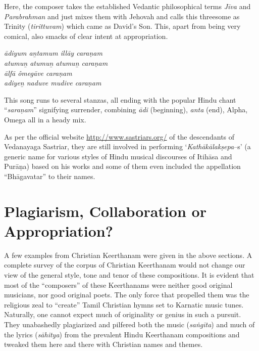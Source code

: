 \begin{myquote}
\end{myquote}

\begin{myquote}
\end{myquote}

Here, the composer takes the established Vedantic philosophical terms \textit{Jīva} and \textit{Parabrahman} and just mixes them with Jehovah and calls this threesome as Trinity (\textit{tirittuvam}) which came as David’s Son. This, apart from being very comical, also smacks of clear intent at appropriation.

\begin{myquote}
\textit{ādiyum aṉtamum illāy caraṇam\\ atumuṉ atumuṉ atumuṉ caraṇam\\ ālfā ômegāve caraṇam\\ adiyeṉ naduve mudive caraṇam}
\end{myquote}

\begin{myquote}
\end{myquote}

This song runs to several stanzas, all ending with the popular Hindu chant “\textit{saraṇam}” signifying surrender, combining \textit{ādi} (beginning), \textit{anta} (end), Alpha, Omega all in a heady mix.

As per the official website \url{http://www.sastriars.org/} of the descendants of Vedanayaga Sastriar, they are still involved in performing ‘\textit{Kathākālakṣepa}–s’ (a generic name for various styles of Hindu musical discourses of Itihāsa and Purāṇa) based on his works and some of them even included the appellation “Bhāgavatar” to their names.


\section*{Plagiarism, Collaboration or Appropriation?}

A few examples from Christian Keerthanam were given in the above sections. A complete survey of the corpus of Christian Keerthanam would not change our view of the general style, tone and tenor of these compositions. It is evident that most of the “composers” of these Keerthanams were neither good original musicians, nor good original poets. The only force that propelled them was the religious zeal to “create” Tamil Christian hymns set to Karnatic music tunes. Naturally, one cannot expect much of originality or genius in such a pursuit. They unabashedly plagiarized and pilfered both the music (\textit{saṅgīta}) and much of the lyrics (\textit{sāhitya}) from the prevalent Hindu Keerthanam compositions and tweaked them here and there with Christian names and themes.

